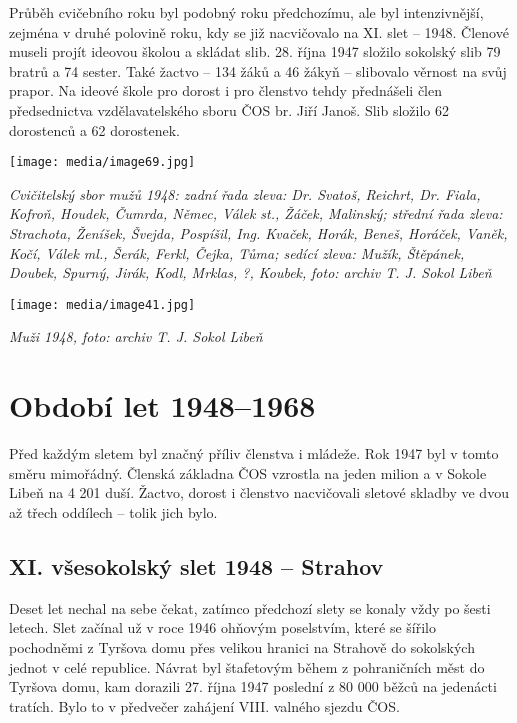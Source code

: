 Průběh cvičebního roku byl podobný roku předchozímu, ale byl
intenzivnější, zejména v druhé polovině roku, kdy se již nacvičovalo na
XI. slet -- 1948. Členové museli projít ideovou školou a skládat slib.
28. října 1947 složilo sokolský slib 79 bratrů a 74 sester. Také žactvo
-- 134 žáků a 46 žákyň -- slibovalo věrnost na svůj prapor. Na ideové
škole pro dorost i pro členstvo tehdy přednášeli člen předsednictva
vzdělavatelského sboru ČOS br. Jiří Janoš. Slib složilo 62 dorostenců a
62 dorostenek.

\texttt{[image: media/image69.jpg]}

\emph{Cvičitelský sbor mužů 1948: zadní řada zleva: Dr. Svatoš, Reichrt,
Dr. Fiala, Kofroň, Houdek, Čumrda, Němec, Válek st., Žáček, Malinský;
střední řada zleva: Strachota, Ženíšek, Švejda, Pospíšil, Ing. Kvaček,
Horák, Beneš, Horáček, Vaněk, Kočí, Válek ml., Šerák, Ferkl, Čejka,
Tůma; sedící zleva: Mužík, Štěpánek, Doubek, Spurný, Jirák, Kodl,
Mrklas, ?, Koubek,} \emph{foto: archiv T. J. Sokol Libeň}

\texttt{[image: media/image41.jpg]}

\emph{Muži 1948, foto: archiv T. J. Sokol Libeň}

\section{Období let 1948--1968}\label{obdobuxed-let-19481968}

Před každým sletem byl značný příliv členstva i mládeže. Rok 1947 byl v
tomto směru mimořádný. Členská základna ČOS vzrostla na jeden milion a v
Sokole Libeň na 4 201 duší. Žactvo, dorost i členstvo nacvičovali
sletové skladby ve dvou až třech oddílech -- tolik jich bylo.

\subsection{XI. všesokolský slet 1948 --
Strahov}\label{xi.-vux161esokolskuxfd-slet-1948-strahov}

Deset let nechal na sebe čekat, zatímco předchozí slety se konaly vždy
po šesti letech. Slet začínal už v roce 1946 ohňovým poselstvím, které
se šířilo pochodněmi z Tyršova domu přes velikou hranici na Strahově do
sokolských jednot v celé republice. Návrat byl štafetovým během z
pohraničních měst do Tyršova domu, kam dorazili 27. října 1947 poslední
z 80 000 běžců na jedenácti tratích. Bylo to v předvečer zahájení VIII.
valného sjezdu ČOS.


